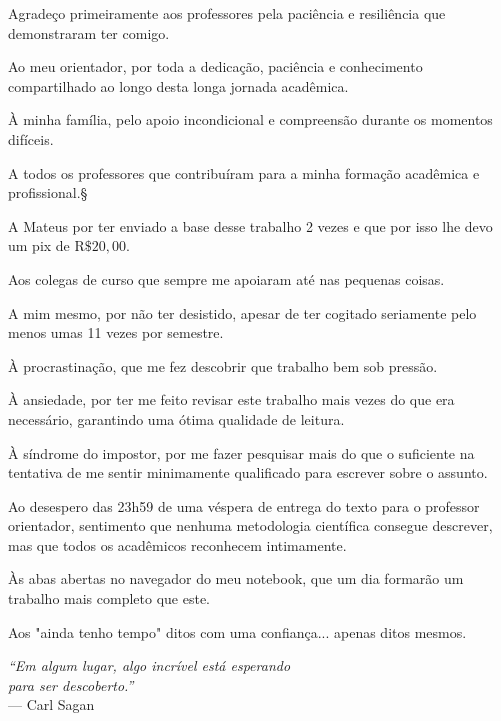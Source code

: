 \documentclass[
	12pt,
	openany,
	oneside,
	a4paper,
	english,
	brazil
]{abntex2}
\begin{document}
\begin{agradecimentos}
Agradeço primeiramente aos professores pela paciência e resiliência que demonstraram ter comigo.

Ao meu orientador, por toda a dedicação, paciência e conhecimento compartilhado ao longo desta longa jornada acadêmica.

À minha família, pelo apoio incondicional e compreensão durante os momentos difíceis.

A todos os professores que contribuíram para a minha formação acadêmica e profissional.§

A Mateus por ter enviado a base desse trabalho 2 vezes e que por isso lhe devo um pix de R$\$20,00$.

Aos colegas de curso que sempre me apoiaram até nas pequenas coisas.

A mim mesmo, por não ter desistido, apesar de ter cogitado seriamente pelo menos umas 11 vezes por semestre.

À procrastinação, que me fez descobrir que trabalho bem sob pressão.

À ansiedade, por ter me feito revisar este trabalho mais vezes do que era necessário, garantindo uma ótima qualidade de leitura.

À síndrome do impostor, por me fazer pesquisar mais do que o suficiente na tentativa de me sentir minimamente qualificado para escrever sobre o assunto.

Ao desespero das 23h59 de uma véspera de entrega do texto para o professor orientador, sentimento que nenhuma metodologia científica consegue descrever, mas que todos os acadêmicos reconhecem intimamente.

Às abas abertas no navegador do meu notebook, que um dia formarão um trabalho mais completo que este.

Aos "ainda tenho tempo"  ditos com uma confiança... apenas ditos mesmos.
\end{agradecimentos}

\begin{epigrafe}
    \vspace*{\fill}
	\begin{flushright}
		\textit{``Em algum lugar, algo incrível está esperando\\
		para ser descoberto.''}\\
		--- Carl Sagan
	\end{flushright}
\end{epigrafe}
\end{document}
